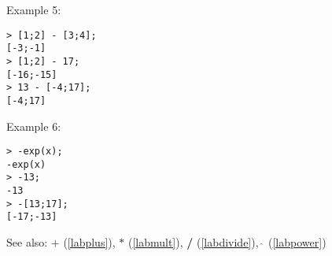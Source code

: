 \noindent Example 5: 
\begin{center}\begin{minipage}{15cm}\begin{Verbatim}[frame=single]
> [1;2] - [3;4];
[-3;-1]
> [1;2] - 17;
[-16;-15]
> 13 - [-4;17];
[-4;17]
\end{Verbatim}
\end{minipage}\end{center}
\noindent Example 6: 
\begin{center}\begin{minipage}{15cm}\begin{Verbatim}[frame=single]
> -exp(x);
-exp(x)
> -13;
-13
> -[13;17];
[-17;-13]
\end{Verbatim}
\end{minipage}\end{center}
See also: \textbf{$+$} (\ref{labplus}), \textbf{$*$} (\ref{labmult}), \textbf{/} (\ref{labdivide}), \textbf{$\mathbf{\hat{~}}$} (\ref{labpower})
